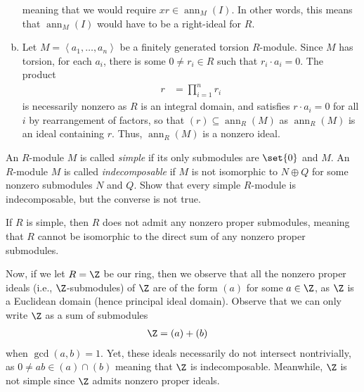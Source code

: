 \documentclass[10pt]{mypackage}
\begin{document}
\begin{solution}
\begin{enumerate}[(a)]
      meaning that we would require $xr\in \operatorname{ann}_M(I)$. In other words, this means that $\operatorname{ann}_M(I)$ would have to be a right-ideal for $R$.
    \item Let $M = \left\langle a_1,\dots,a_n \right\rangle$ be a finitely generated torsion $R$-module. Since $M$ has torsion, for each $a_i$, there is some $0\neq r_i\in R$ such that $r_i\cdot a_i = 0$. The product
      \begin{align*}
        r &= \prod_{i=1}^{n}r_i
      \end{align*}
      is necessarily nonzero as $R$ is an integral domain, and satisfies $r\cdot a_i = 0$ for all $i$ by rearrangement of factors, so that $\left( r \right)\subseteq \operatorname{ann}_{R}\left( M \right)$ as $\operatorname{ann}_R\left( M \right)$ is an ideal containing $r$. Thus, $\operatorname{ann}_R\left( M \right)$ is a nonzero ideal.
  \end{enumerate}
\end{solution}
\begin{problem}[Problem 4]
  An $R$-module $M$ is called \textit{simple} if its only submodules are $\set{0}$ and $M$. An $R$-module $M$ is called \textit{indecomposable} if $M$ is not isomorphic to $N\oplus Q$ for some nonzero submodules $N$ and $Q$. Show that every simple $R$-module is indecomposable, but the converse is not true.
\end{problem}
\begin{solution}
  If $R$ is simple, then $R$ does not admit any nonzero proper submodules, meaning that $R$ cannot be isomorphic to the direct sum of any nonzero proper submodules.\newline

  Now, if we let $R = \Z$ be our ring, then we observe that all the nonzero proper ideals (i.e., $\Z$-submodules) of $\Z$ are of the form $\left( a \right)$ for some $a\in \Z$, as $\Z$ is a Euclidean domain (hence principal ideal domain). Observe that we can only write $\Z$ as a sum of submodules
  \begin{align*}
    \Z &= \left( a \right) + \left( b \right)
  \end{align*}
  when $\operatorname{gcd}\left( a,b \right) = 1$. Yet, these ideals necessarily do not intersect nontrivially, as $0\neq ab\in \left( a \right)\cap\left( b \right)$ meaning that $\Z$ is indecomposable. Meanwhile, $\Z$ is not simple since $\Z$ admits nonzero proper ideals.
\end{solution}
\end{document}
